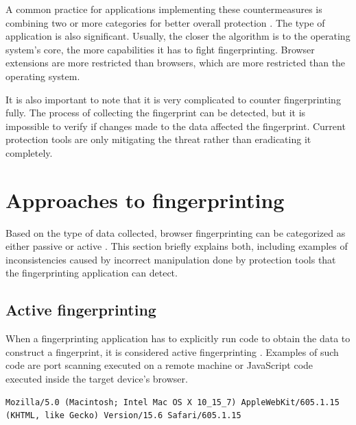 A common practice for applications implementing these countermeasures is combining two or more categories for better overall protection \cite{JShelterPaper}. The type of application is also significant. Usually, the closer the algorithm is to the operating system's core, the more capabilities it has to fight fingerprinting. Browser extensions are more restricted than browsers, which are more restricted than the operating system.

It is also important to note that it is very complicated to counter fingerprinting fully. The process of collecting the fingerprint can be detected, but it is impossible to verify if changes made to the data affected the fingerprint. Current protection tools are only mitigating the threat rather than eradicating it completely.

\section{Approaches to fingerprinting}
\label{Section:FingerprintingApproaches}

Based on the type of data collected, browser fingerprinting can be categorized as either passive or active \cite{JShelterPaper}. This section briefly explains both, including examples of inconsistencies caused by incorrect manipulation done by protection tools that the fingerprinting application can detect.

\subsection{Active fingerprinting}

When a fingerprinting application has to explicitly run code to obtain the data to construct a fingerprint, it is considered active fingerprinting \cite{JShelterPaper}. Examples of such code are port scanning executed on a remote machine or JavaScript code executed inside the target device's browser.

\bigbreak

\begin{lstlisting}[caption={An example of Safari User-Agent string.}, label={Listing:UserAgentSafariFingerprinting}]
Mozilla/5.0 (Macintosh; Intel Mac OS X 10_15_7) AppleWebKit/605.1.15 (KHTML, like Gecko) Version/15.6 Safari/605.1.15
\end{lstlisting}

\medbreak

